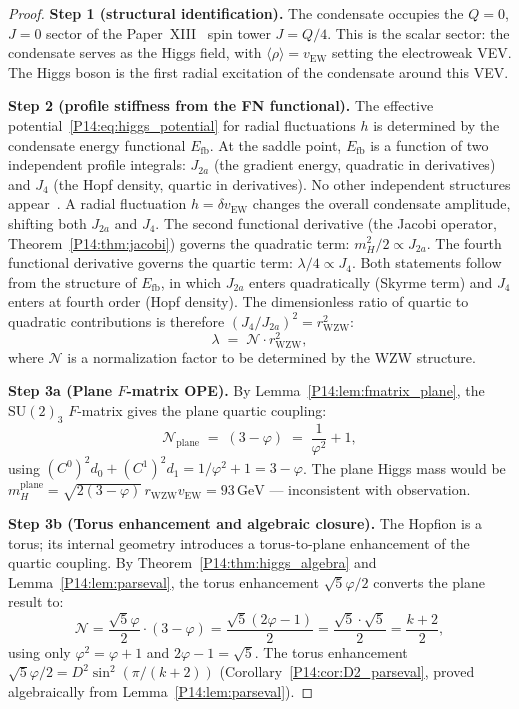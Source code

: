 \documentclass[11pt,a4paper]{article}
\theoremstyle{definition}
\theoremstyle{remark}
\newcommand{\vp}{\varphi}
\newcommand{\vEW}{v_{\mathrm{EW}}}
\newcommand{\Jfour}{J_4}
\newcommand{\Ja}{J_{2a}}
\newcommand{\mH}{m_H}
\begin{document}
\begin{proof}
\textbf{Step 1 (structural identification).}
The condensate occupies the $Q=0$, $J=0$ sector of the Paper~XIII~\cite{Paper13}
spin tower $J=Q/4$.
This is the scalar sector: the condensate serves as the Higgs field,
with $\langle\rho\rangle = \vEW$ setting the electroweak VEV.
The Higgs boson is the first radial excitation of the condensate
around this VEV.

\textbf{Step 2 (profile stiffness from the FN functional).}
The effective potential~\eqref{P14:eq:higgs_potential} for radial fluctuations
$h$ is determined by the condensate energy functional $E_{\mathrm{fb}}$.
At the saddle point, $E_{\mathrm{fb}}$ is a function of two independent profile
integrals: $\Ja$ (the gradient energy, quadratic in derivatives)
and $\Jfour$ (the Hopf density, quartic in derivatives).
No other independent structures appear~\cite{Paper1}.
A radial fluctuation $h = \delta\vEW$ changes the overall condensate
amplitude, shifting both $\Ja$ and $\Jfour$.
The second functional derivative (the Jacobi operator,
Theorem~\ref{P14:thm:jacobi}) governs the quadratic term:
$\mH^2/2 \propto \Ja$.
The fourth functional derivative governs the quartic term:
$\lambda/4 \propto \Jfour$.
Both statements follow from the structure of $E_{\mathrm{fb}}$, in which
$\Ja$ enters quadratically (Skyrme term) and $\Jfour$ enters at
fourth order (Hopf density).
The dimensionless ratio of quartic to quadratic contributions is
therefore $(J_4/J_{2a})^2 = r_{\mathrm{WZW}}^2$:
\begin{equation}
  \lambda \;=\; \mathcal{N}\cdot r_{\mathrm{WZW}}^2,
  \label{P14:eq:lambda_rWZW}
\end{equation}
where $\mathcal{N}$ is a normalization factor to be determined by the
WZW structure.

\textbf{Step 3a (Plane $F$-matrix OPE).}
By Lemma~\ref{P14:lem:fmatrix_plane}, the $\mathrm{SU}(2)_3$ $F$-matrix
gives the plane quartic coupling:
\begin{equation}
  \mathcal{N}_{\mathrm{plane}}
  \;=\; (3-\vp)
  \;=\; \frac{1}{\vp^2}+1,
  \label{P14:eq:N_plane}
\end{equation}
using $(C^0)^2 d_0 + (C^1)^2 d_1 = 1/\vp^2 + 1 = 3-\vp$.
The plane Higgs mass would be
$\mH^{\mathrm{plane}} = \sqrt{2(3-\vp)}\,r_{\mathrm{WZW}}\vEW
= 93\,\mathrm{GeV}$ --- inconsistent with observation.

\textbf{Step 3b (Torus enhancement and algebraic closure).}
The Hopfion is a torus; its internal geometry introduces a
torus-to-plane enhancement of the quartic coupling.
By Theorem~\ref{P14:thm:higgs_algebra} and Lemma~\ref{P14:lem:parseval},
the torus enhancement $\sqrt{5}\vp/2$ converts the plane result to:
\begin{equation}
  \mathcal{N}
  = \frac{\sqrt{5}\vp}{2}\cdot(3-\vp)
  = \frac{\sqrt{5}(2\vp-1)}{2}
  = \frac{\sqrt{5}\cdot\sqrt{5}}{2}
  = \frac{k+2}{2},
  \label{P14:eq:D2_factor}
\end{equation}
using only $\vp^2=\vp+1$ and $2\vp-1=\sqrt{5}$.
The torus enhancement $\sqrt{5}\vp/2 = D^2\sin^2(\pi/(k+2))$
(Corollary~\ref{P14:cor:D2_parseval}, proved algebraically from
Lemma~\ref{P14:lem:parseval}).


\end{proof}
\end{document}
